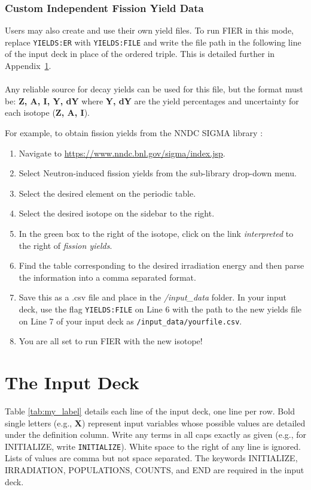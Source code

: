 \documentclass{article}
\begin{document}
\begin{appendices}
\subsubsection{Custom Independent Fission Yield Data}

\noindent Users may also create and use their own yield files. To run FIER in this mode, replace \texttt{YIELDS:ER} with \texttt{YIELDS:FILE} and write the file path in the following line of the input deck in place of the ordered triple. This is detailed further in Appendix~\ref{inputdeck}. 
\\\\
Any reliable source for decay yields can be used for this file, but the format must be:
\textbf{Z, A, I, Y, dY} where 
\textbf{Y, dY} are the yield percentages and uncertainty for each isotope (\textbf{Z, A, I}).

\noindent For example, to obtain fission yields from the NNDC SIGMA library \cite{SIGMA}:
\begin{enumerate}
    \item Navigate to \url{https://www.nndc.bnl.gov/sigma/index.jsp}.
    \item Select Neutron-induced fission yields from the sub-library drop-down menu.
    \item Select the desired element on the periodic table.
    \item Select the desired isotope on the sidebar to the right.
    \item In the green box to the right of the isotope, click on the link \textit{interpreted} to the right of \textit{fission yields}.
    \item Find the table corresponding to the desired irradiation energy and then parse the information into a comma separated format.
    \item Save this as a .csv file and place in the \textit{/input\_data} folder. In your input deck, use the flag \texttt{YIELDS:FILE} on Line 6 with the path to the new yields file on Line 7 of your input deck as \texttt{/input\_data/yourfile.csv}.
    \item You are all set to run FIER with the new isotope! 
\end{enumerate}




\newpage
\section{The Input Deck}
\label{inputdeck}
Table \ref{tab:my_label} details each line of the input deck, one line per row. Bold single letters (e.g., \textbf{X}) represent input variables whose possible values are detailed under the definition column. Write any terms in all caps exactly as given (e.g., for INITIALIZE, write \texttt{INITIALIZE}). White space to the right of any line is ignored. Lists of values are comma but not space separated. The keywords INITIALIZE, IRRADIATION, POPULATIONS, COUNTS, and END are required in the input deck. 
\renewcommand*{\arraystretch}{1.5}
    \begin{longtable}{p{}p{} p{}} 
    

\end{longtable}
\end{appendices}
\end{document}
